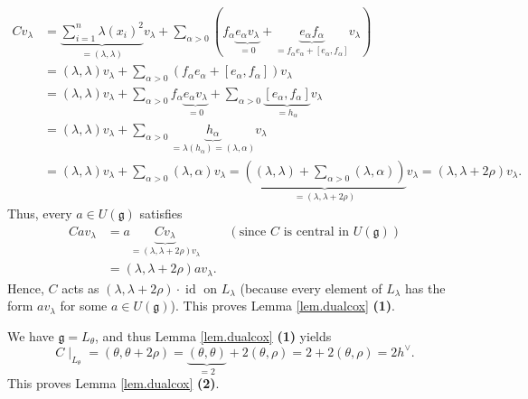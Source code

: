 \documentclass
[numbers=enddot,12pt,final,onecolumn,german,notitlepage]{scrartcl}%
\theoremstyle{definition}
\begin{document}
\begin{align*}
Cv_{\lambda}  &  =\underbrace{\sum\limits_{i=1}^{n}\lambda\left(
x_{i}\right)  ^{2}}_{=\left(  \lambda,\lambda\right)  }v_{\lambda}%
+\sum\limits_{\alpha>0}\left(  f_{\alpha}\underbrace{e_{\alpha}v_{\lambda}%
}_{=0}+\underbrace{e_{\alpha}f_{\alpha}}_{=f_{\alpha}e_{\alpha}+\left[
e_{\alpha},f_{\alpha}\right]  }v_{\lambda}\right) \\
&  =\left(  \lambda,\lambda\right)  v_{\lambda}+\sum\limits_{\alpha>0}\left(
f_{\alpha}e_{\alpha}+\left[  e_{\alpha},f_{\alpha}\right]  \right)
v_{\lambda}\\
&  =\left(  \lambda,\lambda\right)  v_{\lambda}+\sum\limits_{\alpha
>0}f_{\alpha}\underbrace{e_{\alpha}v_{\lambda}}_{=0}+\sum\limits_{\alpha
>0}\underbrace{\left[  e_{\alpha},f_{\alpha}\right]  }_{=h_{\alpha}}%
v_{\lambda}\\
&  =\left(  \lambda,\lambda\right)  v_{\lambda}+\sum\limits_{\alpha
>0}\underbrace{h_{\alpha}}_{=\lambda\left(  h_{\alpha}\right)  =\left(
\lambda,\alpha\right)  }v_{\lambda}\\
&  =\left(  \lambda,\lambda\right)  v_{\lambda}+\sum\limits_{\alpha>0}\left(
\lambda,\alpha\right)  v_{\lambda}=\underbrace{\left(  \left(  \lambda
,\lambda\right)  +\sum\limits_{\alpha>0}\left(  \lambda,\alpha\right)
\right)  }_{=\left(  \lambda,\lambda+2\rho\right)  }v_{\lambda}=\left(
\lambda,\lambda+2\rho\right)  v_{\lambda}.
\end{align*}
Thus, every $a\in U\left(  \mathfrak{g}\right)  $ satisfies
\begin{align*}
Cav_{\lambda}  &  =a\underbrace{Cv_{\lambda}}_{=\left(  \lambda,\lambda
+2\rho\right)  v_{\lambda}}\ \ \ \ \ \ \ \ \ \ \left(  \text{since }C\text{ is
central in }U\left(  \mathfrak{g}\right)  \right) \\
&  =\left(  \lambda,\lambda+2\rho\right)  av_{\lambda}.
\end{align*}
Hence, $C$ acts as $\left(  \lambda,\lambda+2\rho\right)  \cdot
\operatorname*{id}$ on $L_{\lambda}$ (because every element of $L_{\lambda}$
has the form $av_{\lambda}$ for some $a\in U\left(  \mathfrak{g}\right)  $).
This proves Lemma \ref{lem.dualcox} \textbf{(1)}.

We have $\mathfrak{g}=L_{\theta}$, and thus Lemma \ref{lem.dualcox}
\textbf{(1)} yields%
\[
C\mid_{L_{\theta}}=\left(  \theta,\theta+2\rho\right)  =\underbrace{\left(
\theta,\theta\right)  }_{=2}+2\left(  \theta,\rho\right)  =2+2\left(
\theta,\rho\right)  =2h^{\vee}.
\]
This proves Lemma \ref{lem.dualcox} \textbf{(2)}.
\end{document}
